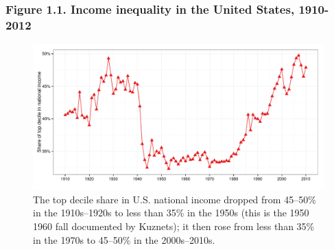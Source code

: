 \documentclass[t]{beamer}\usepackage[]{graphicx}\usepackage[]{color}
\newenvironment{knitrout}{}{} %
\begin{document}
\begin{frame}[label=Fig11,fragile]
\frametitle{Figure 1.1. Income inequality in the United States, 1910-2012}
\begin{figure}[t]
\begin{minipage}[b]{\textwidth}
\centering
\begin{knitrout}\footnotesize
{}\color{fgcolor}

{\centering \includegraphics[width=1\linewidth]{figures/color/Figure_1_1} 

}



\end{knitrout}
\caption{The top decile share in U.S. national income dropped from 45--50\% in the 1910s--1920s to less than 35\% in the 1950s (this is the
1950 1960 fall documented by Kuznets); it then rose from less than 35\% in the 1970s to 45--50\% in the 2000s--2010s.}
\end{minipage}
\end{figure}
\end{frame}
\end{document}
